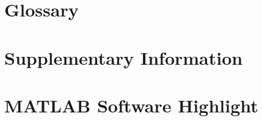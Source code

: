 \documentclass[a4paper, english, twoside, 12pt]{article}
\begin{document}

\pagebreak
\begin{appendices} 
	\section{Glossary}
	\printglossaries
	\pagebreak
	\section{Supplementary Information}
	
	\section{MATLAB Software Highlight}
	
\end{appendices}
\end{document}
